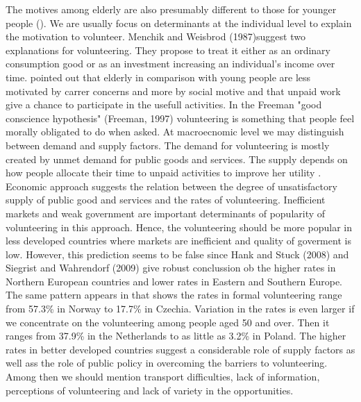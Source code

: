 \documentclass[10pt, letterpaper]{article}
\begin{document}
\begin{spacing}{1.4}
The motives among elderly are also presumably different to those for younger people (\citet{wilson12}). We are usually focus on determinants at the individual level to explain the motivation to volunteer. Menchik and Weisbrod (1987)suggest two explanations for volunteering. They propose to treat it either as an ordinary consumption good or as an investment increasing an individual's income over time. \citet{haski09} pointed out that elderly in comparison with young people are less motivated by carrer concerns and  more by social motive and that unpaid work give a  chance to participate in the usefull activities. In the Freeman "good conscience hypothesis" (Freeman, 1997) volunteering is something that people feel morally obligated to do when asked. At macroecnomic level we may distinguish  between demand and supply factors. The demand for volunteering is mostly created by unmet demand for public goods and services. The supply depends on how people allocate their time to unpaid activities to improve her utility \citet{ziemek06}. Economic approach  suggests the relation between the degree of unsatisfactory supply of public good and services and the rates of volunteering. Inefficient markets and weak government are important determinants of popularity of volunteering in this approach. Hence, the volunteering should be more popular in less developed countries where markets are inefficient and quality of goverment is low. However, this prediction seems to be false since Hank and Stuck
(2008) and Siegrist and Wahrendorf (2009)  give robust conclussion ob the higher rates in Northern European countries and lower rates in Eastern and Southern Europe. The same pattern appears in \citet{Oecd15} that shows the rates in formal volunteering range from 57.3\% in Norway to 17.7\% in Czechia. Variation in the rates is even larger if we concentrate on the volunteering among people aged 50 and over. Then it ranges from 37.9\% in the Netherlands to as little as 3.2\% in Poland. The higher rates in better developed countries suggest a considerable role of supply factors as well ass the role of public policy in overcoming the barriers to volunteering. Among then we should mention transport difficulties, lack of information, perceptions of volunteering and lack of variety in the opportunities.  \\


\end{spacing}
\end{document}
